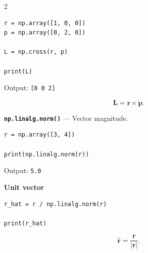 \documentclass[10pt,a4paper]{article}
\begin{document}
\begin{multicols}{2}
\begin{card}
\begin{lstlisting}[style=pythonstyle]
r = np.array([1, 0, 0])
p = np.array([0, 2, 0])

L = np.cross(r, p)

print(L)
\end{lstlisting}

Output:
\texttt{[0 0 2]}

\[
\mathbf L=\mathbf r\times\mathbf p.
\]
\end{card}

\begin{card}
\textbf{\texttt{np.linalg.norm()}} --- Vector magnitude.

\begin{lstlisting}[style=pythonstyle]
r = np.array([3, 4])

print(np.linalg.norm(r))
\end{lstlisting}

Output: \texttt{5.0}
\end{card}

\begin{card}
\textbf{Unit vector}

\begin{lstlisting}[style=pythonstyle]
r_hat = r / np.linalg.norm(r)

print(r_hat)
\end{lstlisting}

\[
\hat{\mathbf r}
=
\frac{\mathbf r}{|\mathbf r|}.
\]
\end{card}


\end{multicols}

\newpage
\end{document}

